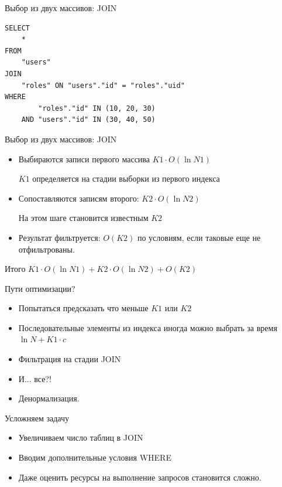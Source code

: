 \documentclass[aspectratio=169]{beamer}
\begin{document}
\begin{frame}[fragile]{Выбор из двух массивов: JOIN}
\begin{verbatim}
SELECT
    *
FROM
    "users"
JOIN
    "roles" ON "users"."id" = "roles"."uid"
WHERE
        "roles"."id" IN (10, 20, 30)
    AND "users"."id" IN (30, 40, 50)
\end{verbatim}
\end{frame}

\begin{frame}{Выбор из двух массивов: JOIN}
    \begin{itemize}
        \item Выбираются записи первого массива $K1 \cdot O(\ln{N1})$
            \par {\small $K1$ определяется на стадии
                выборки из первого индекса}
        \item Сопоставляются записям второго: $K2 \cdot O(\ln{N2})$
            \par {\small На этом шаге становится известным $K2$}
        \item Результат фильтруется: $O(K2)$ по условиям,
          если таковые еще не отфильтрованы.
    \end{itemize}

    \begin{block}{Итого}
        $K1 \cdot O(\ln{N1}) + K2 \cdot O(\ln{N2}) + O(K2)$
    \end{block}
\end{frame}

\begin{frame}{Пути оптимизации?}
    \begin{itemize}
        \item Попытаться предсказать что меньше $K1$ или $K2$
        \item Последовательные элементы из индекса иногда
            можно выбрать за время $\ln{N} + K1 \cdot c$
        \item Фильтрация на стадии JOIN

        \item И... все?!

        \pause\item Денормализация.
    \end{itemize}
\end{frame}

\begin{frame}{Усложняем задачу}
    \begin{itemize}
        \item Увеличиваем число таблиц в JOIN
        \item Вводим дополнительные условия WHERE
        \item Даже оценить ресурсы на выполнение запросов
            становится сложно.
    \end{itemize}
\end{frame}
\end{document}
